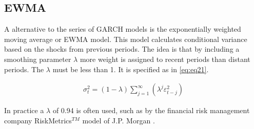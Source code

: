 \documentclass[a4paper, twoside]{templates/ociamthesis}
\newcommand*{\bibtitle}{Works Cited}
\begin{document}
\newpage

\hypertarget{ewma}{%
\subsection{EWMA}\label{ewma}}

\noindent A alternative to the series of GARCH models is the exponentially weighted moving average or EWMA model. This model calculates conditional variance based on the shocks from previous periods. The idea is that by including a smoothing parameter \(\lambda\) more weight is assigned to recent periods than distant periods. The \(\lambda\) must be less than 1. It is specified as in \eqref{eq:eq21}.

\begin{align}
\sigma_t^2 = (1-\lambda) \sum\limits_{j=1}^\infty (\lambda^j \varepsilon_{t-j}^2)
 \label{eq:eq21}
\end{align}

In practice a \(\lambda\) of 0.94 is often used, such as by the financial risk management company RiskMetrics\(^{TM}\) model of J.P. Morgan \autocite{morganguarantytrustcompany1996}.




\setlength{\baselineskip}{0pt} %

{\renewcommand*\MakeUppercase[1]{#1}%
\printbibliography[heading=bibintoc,title={\bibtitle}]}
\end{document}
